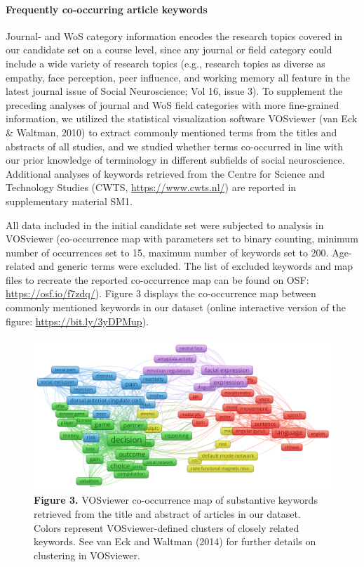 \documentclass[
  english,
  man,floatsintext]{apa6}
\let\oldparagraph\paragraph
\renewcommand{\paragraph}[1]{\oldparagraph{#1}\mbox{}}
\begin{document}
\hypertarget{frequently-co-occurring-article-keywords}{%
\paragraph{Frequently co-occurring article keywords}\label{frequently-co-occurring-article-keywords}}

Journal- and WoS category information encodes the research topics covered in our candidate set on a course level, since any journal or field category could include a wide variety of research topics (e.g., research topics as diverse as empathy, face perception, peer influence, and working memory all feature in the latest journal issue of Social Neuroscience; Vol 16, issue 3). To supplement the preceding analyses of journal and WoS field categories with more fine-grained information, we utilized the statistical visualization software VOSviewer (van Eck \& Waltman, 2010) to extract commonly mentioned terms from the titles and abstracts of all studies, and we studied whether terms co-occurred in line with our prior knowledge of terminology in different subfields of social neuroscience. Additional analyses of keywords retrieved from the Centre for Science and Technology Studies (CWTS, \url{https://www.cwts.nl/}) are reported in supplementary material SM1.

All data included in the initial candidate set were subjected to analysis in VOSviewer (co-occurrence map with parameters set to binary counting, minimum number of occurrences set to 15, maximum number of keywords set to 200. Age-related and generic terms were excluded. The list of excluded keywords and map files to recreate the reported co-occurrence map can be found on OSF: \url{https://osf.io/f7zdq/}). Figure 3 displays the co-occurrence map between commonly mentioned keywords in our dataset (online interactive version of the figure: \url{https://bit.ly/3yDPMup}).

\begin{figure}
\centering
\includegraphics{vosviewer_label_cooccurence.png}
\caption{\textbf{Figure 3.} VOSviewer co-occurrence map of substantive keywords retrieved from the title and abstract of articles in our dataset. Colors represent VOSviewer-defined clusters of closely related keywords. See van Eck and Waltman (2014) for further details on clustering in VOSviewer.}
\end{figure}
\end{document}
